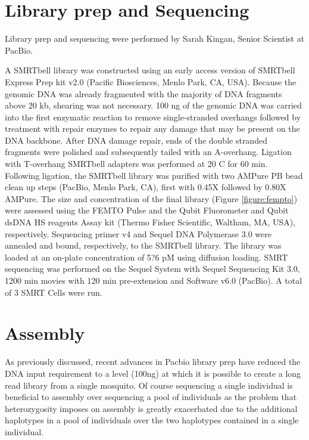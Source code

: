 \section{Library prep and Sequencing}

Library prep and sequencing were performed by Sarah Kingan, Senior Scientist at PacBio. 

A SMRTbell library was constructed using an early access version of SMRTbell Express Prep kit v2.0 (Pacific Biosciences, Menlo Park, CA, USA). Because the genomic DNA was already fragmented with the majority of DNA fragments above 20 kb, shearing was not necessary. 100 ng of the genomic DNA was carried into the first enzymatic reaction to remove single-stranded overhangs followed by treatment with repair enzymes to repair any damage that may be present on the DNA backbone. After DNA damage repair, ends of the double stranded fragments were polished and subsequently tailed with an A-overhang. Ligation with T-overhang SMRTbell adapters was performed at 20 C for 60 min. Following ligation, the SMRTbell library was purified with two AMPure PB bead clean up steps (PacBio, Menlo Park, CA), first with 0.45X followed by 0.80X AMPure. The size and concentration of the final library (Figure  \ref{figure:fempto}) were assessed using the FEMTO Pulse and the Qubit Fluorometer and Qubit dsDNA HS reagents Assay kit (Thermo Fisher Scientific, Waltham, MA, USA), respectively.
Sequencing primer v4 and Sequel DNA Polymerase 3.0 were annealed and bound, respectively, to the SMRTbell library. The library was loaded at an on-plate concentration of 5?6 pM using diffusion loading. SMRT sequencing was performed on the Sequel System with Sequel Sequencing Kit 3.0, 1200 min movies with 120 min pre-extension and Software v6.0 (PacBio). A total of 3 SMRT Cells were run.


\section{Assembly}

As previously discussed, recent advances in Pacbio library prep have reduced the DNA input requirement to a level (100ng) at which it is 
possible to create a long read library from a single mosquito. Of course sequencing a single individual is beneficial to assembly over 
sequencing a pool of individuals as the problem that heterozygosity imposes on assembly is greatly exacerbated due to the additional haplotypes 
in a pool of individuals over the two haplotypes contained in a single individual. 

